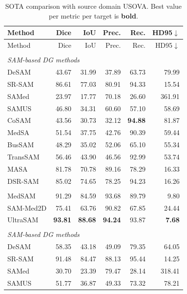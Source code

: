 \documentclass[10pt]{article}
\begin{document}
{\small
\begin{longtable}{lrrrrr}
\caption{SOTA comparison with source domain USOVA. Best value per metric per target is \textbf{bold}.}
\label{tab:sota_usova}\\
\toprule
Method & Dice & IoU & Prec. & Rec. & HD95$\downarrow$ \\
\midrule
\endfirsthead
\toprule
Method & Dice & IoU & Prec. & Rec. & HD95$\downarrow$ \\
\midrule
\endhead
\endfoot
\bottomrule
\endlastfoot
\multicolumn{6}{l}{\textit{Target: OTU}} \\
\midrule
\multicolumn{6}{l}{\textit{SAM-based DG methods}} \\
DeSAM & 43.67 & 31.99 & 37.89 & 63.73 & 79.99 \\
SR-SAM & 86.61 & 77.03 & 80.91 & 94.33 & 15.54 \\
SAMed & 23.97 & 17.77 & 70.18 & 26.60 & 361.91 \\
SAMUS & 46.80 & 34.31 & 60.60 & 57.10 & 58.69 \\
CoSAM & 43.56 & 30.73 & 32.12 & \textbf{94.88} & 81.87 \\
MedSA & 51.54 & 37.75 & 42.76 & 90.39 & 59.44 \\
BusSAM & 48.29 & 35.02 & 52.06 & 65.10 & 55.34 \\
TransSAM & 56.46 & 43.90 & 46.56 & 92.99 & 53.74 \\
MASA & 81.78 & 70.78 & 89.16 & 78.29 & 16.33 \\
DSR-SAM & 85.02 & 74.65 & 78.25 & 94.23 & 16.26 \\
\addlinespace[2pt]
\multicolumn{6}{l}{\textit{Zero-shot foundation models}} \\
MedSAM & 91.29 & 84.59 & 93.68 & 89.79 & 9.80 \\
SAM-Med2D & 75.41 & 63.76 & 90.82 & 67.85 & 24.44 \\
UltraSAM & \textbf{93.81} & \textbf{88.68} & \textbf{94.24} & 93.87 & \textbf{7.68} \\
\addlinespace[4pt]
\multicolumn{6}{l}{\textit{Target: OVATUS}} \\
\midrule
\multicolumn{6}{l}{\textit{SAM-based DG methods}} \\
DeSAM & 58.35 & 43.18 & 49.09 & 79.35 & 64.05 \\
SR-SAM & 91.48 & 84.47 & 88.13 & 95.44 & 14.25 \\
SAMed & 30.70 & 23.39 & 79.47 & 28.14 & 318.41 \\
SAMUS & 51.77 & 36.87 & 49.33 & 73.32 & 78.21 \\

\end{longtable}}
\end{document}
